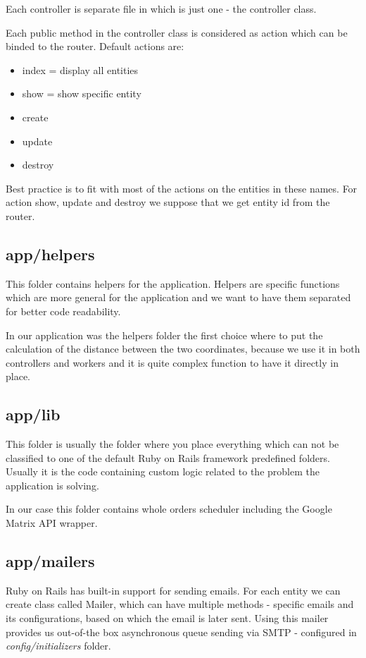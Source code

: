 		Each controller is separate file in which is just one - the controller class.
		
		Each public method in the controller class is considered as action which can be binded to the router. Default actions are:
		\begin{itemize}
			\item index = display all entities
			\item show = show specific entity
			\item create
			\item update
			\item destroy		
		\end{itemize} 
	
		Best practice is to fit with most of the actions on the entities in these names. For action show, update and destroy we suppose that we get entity id from the router.
	\subsection{app/helpers}
		This folder contains helpers for the application. Helpers are specific functions which are more general for the application and we want to have them separated for better code readability. 
		
		In our application was the helpers folder the first choice where to put the calculation of the distance between the two coordinates, because we use it in both controllers and workers and it is quite complex function to have it directly in place.
	\subsection{app/lib}
		This folder is usually the folder where you place everything which can not be classified to one of the default Ruby on Rails framework predefined folders. Usually it is the code containing custom logic related to the problem the application is solving.
		
		In our case this folder contains whole orders scheduler including the Google Matrix API wrapper.
		
	\subsection{app/mailers}
		Ruby on Rails has built-in support for sending emails. For each entity we can create class called Mailer, which can have multiple methods - specific emails and its configurations, based on which the email is later sent. Using this mailer provides us out-of-the box asynchronous queue sending via SMTP - configured in \textit{config/initializers} folder.
		 
